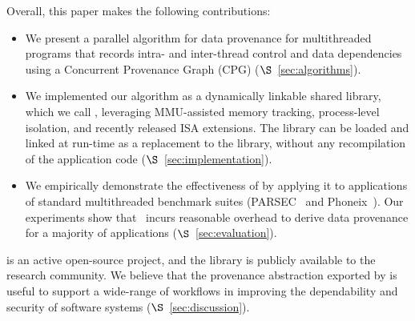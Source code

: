 Overall, this paper makes the following contributions:
\begin{itemize}

\item We present a parallel algorithm for data provenance for multithreaded programs that records intra- and inter-thread control and data dependencies using a Concurrent Provenance Graph (CPG) ($\S$~\ref{sec:algorithms}).

\item We implemented our algorithm as a dynamically linkable shared library, which we call \projecttitle, leveraging MMU-assisted memory tracking, process-level isolation, and recently released \intelpt ISA extensions.  The \projecttitle library can be loaded and linked at run-time as a replacement to the \pthreads library, without any recompilation  of the application code ($\S$~\ref{sec:implementation}).

\item  We  empirically demonstrate  the effectiveness of \projecttitle by applying it to applications of standard multithreaded benchmark suites (PARSEC~\cite{parsec} and Phoneix~\cite{phoenix}). Our experiments show that \projecttitle~incurs reasonable overhead to derive data provenance for a majority of applications ($\S$~\ref{sec:evaluation}). 

\end{itemize}

\projecttitle is an active open-source project, and the library is publicly available to the research community. We believe that the provenance abstraction exported by \projecttitle is useful to support a wide-range of workflows in improving the dependability and security of software systems ($\S$~\ref{sec:discussion}).
